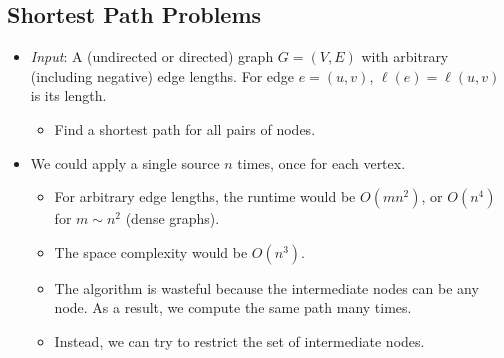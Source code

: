 \subsection{Shortest Path Problems}
\begin{itemize}
    \item \textit{Input}: A (undirected or directed) graph $G = (V, E)$ with arbitrary (including negative) edge lengths. For edge $e = (u, v)$, $\ell(e) = \ell(u, v)$ is its length.
    \begin{itemize}
        \item Find a shortest path for all pairs of nodes.
    \end{itemize}
    \item We could apply a single source $n$ times, once for each vertex.
    \begin{itemize}
        \item For arbitrary edge lengths, the runtime would be $O(mn^2)$, or $O(n^4)$ for $m \sim n^2$ (dense graphs).
        \item The space complexity would be $O(n^3)$.
        \item The algorithm is wasteful because the intermediate nodes can be any node. As a result, we compute the same path many times.
        \item Instead, we can try to restrict the set of intermediate nodes.
    \end{itemize}
\end{itemize}

